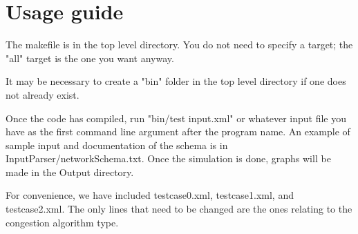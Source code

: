 
\section{Usage guide}

The makefile is in the top level directory. You do not need to specify a target; the "all" target is the one you want anyway.

It may be necessary to create a "bin" folder in the top level directory if one does not already exist.

Once the code has compiled, run "bin/test input.xml" or whatever input file you have as the first command line argument after the program name. An example of sample input and documentation of the schema is in InputParser/networkSchema.txt. Once the simulation is done, graphs will be made in the Output directory.

For convenience, we have included testcase0.xml, testcase1.xml, and testcase2.xml. The only lines that need to be changed are the ones relating to the congestion algorithm type. 
